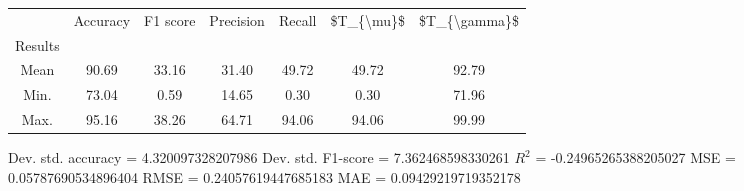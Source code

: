 \begin{tabular}{|c|c|c|c|c|c|c|}
\toprule
{} &  Accuracy &  F1 score &  Precision &  Recall &  \$T\_\{\textbackslash mu\}\$ &  \$T\_\{\textbackslash gamma\}\$ \\
Results &           &           &            &         &            &               \\
\hline
Mean    &     90.69 &     33.16 &      31.40 &   49.72 &      49.72 &         92.79 \\
Min.    &     73.04 &      0.59 &      14.65 &    0.30 &       0.30 &         71.96 \\
Max.    &     95.16 &     38.26 &      64.71 &   94.06 &      94.06 &         99.99 \\
\bottomrule
\end{tabular}

 Dev. std. accuracy = 4.320097328207986
 Dev. std. F1-score = 7.362468598330261
 $R^2$ = -0.24965265388205027
 MSE = 0.05787690534896404
 RMSE = 0.24057619447685183
 MAE = 0.09429219719352178